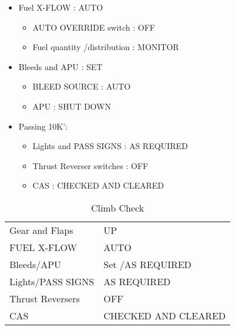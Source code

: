 \begin{itemize}
\item Fuel X-FLOW : AUTO

\begin{itemize}
\item AUTO OVERRIDE switch : OFF

\item Fuel quantity \slash  distribution : MONITOR

\end{itemize}

\item Bleeds and APU : SET

\begin{itemize}
\item BLEED SOURCE : AUTO

\item APU : SHUT DOWN

\end{itemize}

\item Passing 10K':

\begin{itemize}
\item Lights and PASS SIGNS : AS REQUIRED

\item Thrust Reverser switches : OFF

\item CAS : CHECKED AND CLEARED

\end{itemize}

\end{itemize}

\begin{table}[htbp]
\begin{minipage}{\linewidth}
\setlength{\tymax}{0.5\linewidth}
\centering
\small
\caption{Climb Check}
\label{climbcheck}
\begin{tabulary}{\textwidth}{@{}ll@{}} \toprule
\midrule

 Gear and Flaps & UP     \\
 FUEL X-FLOW  & AUTO    \\
 Bleeds\slash APU  & Set \slash  AS REQUIRED \\
 Lights\slash PASS SIGNS & AS REQUIRED   \\
 Thrust Reversers & OFF     \\
 CAS    & CHECKED AND CLEARED \\
\bottomrule

\end{tabulary}
\end{minipage}
\end{table}

